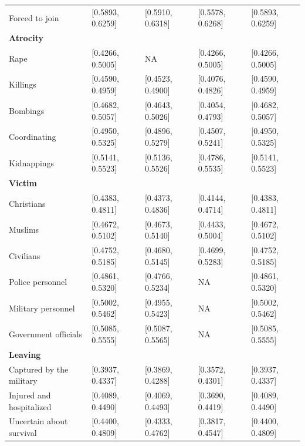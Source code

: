 \begin{table}[H]
\begin{threeparttable}
\begin{tabular}{lllll}
Forced to join          & [0.5893, 0.6259]      & [0.5910, 0.6318]      & [0.5578, 0.6268]      & [0.5893, 0.6259]\\ [0.9ex]
\textbf{Atrocity} \\  
Rape         & [0.4266, 0.5005]                 & NA                    & [0.4266, 0.5005]      & [0.4266, 0.5005]\\ 
Killings     & [0.4590, 0.4959]                 & [0.4523, 0.4900]      & [0.4076, 0.4826]      & [0.4590, 0.4959]\\ 
Bombings     & [0.4682, 0.5057]                 & [0.4643, 0.5026]      & [0.4054, 0.4793]      & [0.4682, 0.5057]\\ 
Coordinating & [0.4950, 0.5325]                 & [0.4896, 0.5279]      & [0.4507, 0.5241]      & [0.4950, 0.5325]\\ 
Kidnappings  & [0.5141, 0.5523]                 & [0.5136, 0.5526]      & [0.4786, 0.5535]      & [0.5141, 0.5523]\\ [0.9ex]
\textbf{Victim} \\  
Christians  & [0.4383, 0.4811]                  & [0.4373, 0.4836]      & [0.4144, 0.4714]      & [0.4383, 0.4811]\\ 
Muslims     & [0.4672, 0.5102]                  & [0.4673, 0.5140]      & [0.4433, 0.5004]      & [0.4672, 0.5102]\\ 
Civilians   & [0.4752, 0.5185]                  & [0.4680, 0.5145]      & [0.4699, 0.5283]      & [0.4752, 0.5185]\\ 
Police personnel    & [0.4861, 0.5320]          & [0.4766, 0.5234]      & NA                    & [0.4861, 0.5320]\\ 
Military personnel  & [0.5002, 0.5462]          & [0.4955, 0.5423]      & NA                    & [0.5002, 0.5462]\\ 
Government officials &[0.5085, 0.5555]          & [0.5087, 0.5565]      & NA                    & [0.5085, 0.5555]\\ [0.9ex]
\textbf{Leaving} \\  
Captured by the military & [0.3937, 0.4337]                     & [0.3869, 0.4288]      & [0.3572, 0.4301]      & [0.3937, 0.4337] \\ 
Injured and hospitalized & [0.4089, 0.4490]                     & [0.4069, 0.4493]      & [0.3690, 0.4419]      & [0.4089, 0.4490] \\ 
Uncertain about survival & [0.4400, 0.4809]                     & [0.4333, 0.4762]      & [0.3817, 0.4547]      & [0.4400, 0.4809]\\ 

\end{tabular}
\end{threeparttable}
\end{table}

